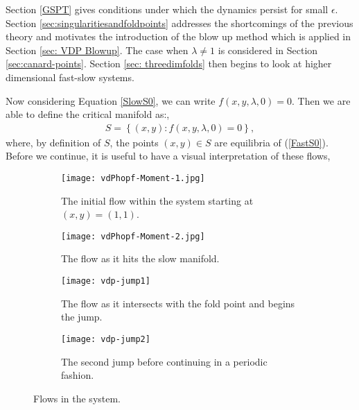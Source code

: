 Section \ref{GSPT} gives conditions under which the dynamics persist for small $\epsilon$. Section \ref{sec:singularitiesandfoldpoints} addresses the shortcomings of the previous theory and motivates the introduction of the blow up method which is applied in Section \ref{sec: VDP Blowup}. The case when $\lambda \neq 1$ is considered in Section \ref{sec:canard-points}. Section \ref{sec: threedimfolds} then begins to look at higher dimensional fast-slow systems.




Now considering Equation \ref{SlowS0}, we can write $f(x,y,\lambda, 0)=0$. Then we are able to define the critical manifold as:,
	\begin{align} \label{CriticalS}
		S= \left\{ (x,y) : f(x,y,\lambda, 0)=0 \right \},
	\end{align}
where, by definition of $S$, the points $(x,y) \in S$ are equilibria of (\ref{FastS0}). Before we continue, it is useful to have a visual interpretation of these flows,
\begin{figure}[h!]\centering
	\begin{subfigure}[t]{0.45\textwidth}
		\centering
		\texttt{[image: vdPhopf-Moment-1.jpg]}
		\caption{The initial flow within the system starting at $ (x,y)=(1,1) $.}
	\end{subfigure}
	\hfill
	\begin{subfigure}[t]{0.45\textwidth}
		\centering
		\texttt{[image: vdPhopf-Moment-2.jpg]}
		\caption{The flow as it hits the slow manifold.}
	\end{subfigure}

	\vspace{1cm}
	\begin{subfigure}[t]{0.45\textwidth}
		\centering
		\texttt{[image: vdp-jump1]}
		\caption{The flow as it intersects with the fold point and begins the jump.}
	\end{subfigure}
	\hfill
	\begin{subfigure}[t]{0.45\textwidth}\centering
		\texttt{[image: vdp-jump2]}
		\caption{The second jump before continuing in a periodic fashion.}
	\end{subfigure}
	\caption{Flows in the \vdp system.}
	\label{fig: vdp flow diagram}
\end{figure}



